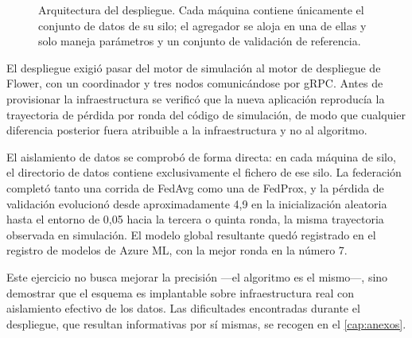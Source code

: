 \begin{figure}[H]
  \centering
  \caption[Despliegue distribuido en Azure]{Arquitectura del despliegue. Cada máquina contiene
  únicamente el conjunto de datos de su silo; el agregador se aloja en una de ellas y solo maneja
  parámetros y un conjunto de validación de referencia.}
  \label{fig:azure}
\end{figure}

El despliegue exigió pasar del motor de simulación al motor de despliegue de Flower, con un
coordinador y tres nodos comunicándose por gRPC. Antes de provisionar la infraestructura se
verificó que la nueva aplicación reproducía la trayectoria de pérdida por ronda del código de
simulación, de modo que cualquier diferencia posterior fuera atribuible a la infraestructura y no
al algoritmo.

El aislamiento de datos se comprobó de forma directa: en cada máquina de silo, el directorio de
datos contiene exclusivamente el fichero de ese silo. La federación completó tanto una corrida de
FedAvg como una de FedProx, y la pérdida de validación evolucionó desde aproximadamente 4,9 en la
inicialización aleatoria hasta el entorno de 0,05 hacia la tercera o quinta ronda, la misma
trayectoria observada en simulación. El modelo global resultante quedó registrado en el registro de
modelos de Azure ML, con la mejor ronda en la número 7.

Este ejercicio no busca mejorar la precisión —el algoritmo es el mismo—, sino demostrar que el
esquema es implantable sobre infraestructura real con aislamiento efectivo de los datos. Las
dificultades encontradas durante el despliegue, que resultan informativas por sí mismas, se recogen
en el \cref{cap:anexos}.
